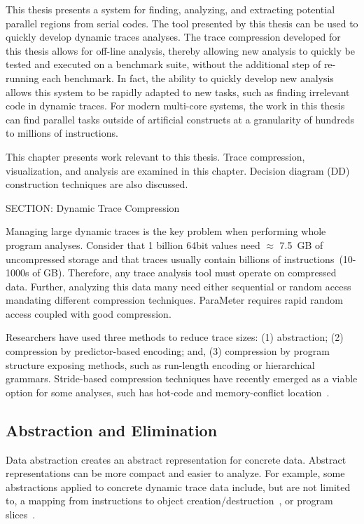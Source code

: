 {This thesis presents a system for finding, analyzing, and extracting potential parallel regions from serial codes.  The tool presented by this thesis can be used to quickly develop dynamic traces analyses. The trace compression developed for this thesis allows for off-line analysis, thereby allowing new analysis to quickly be tested and executed on a benchmark suite, without the additional step of re-running each benchmark.  In fact, the ability to quickly develop new analysis allows this system to be rapidly adapted to new tasks, such as finding irrelevant code in dynamic traces.  For modern multi-core systems, the work in this thesis can find parallel tasks outside of artificial constructs at a granularity of hundreds to millions of instructions.


This chapter presents work relevant to this thesis.  Trace compression, visualization, and analysis are examined in this chapter. Decision diagram (DD) construction techniques are also discussed.

SECTION: Dynamic Trace Compression


Managing large dynamic traces is the key problem when performing whole program analyses. Consider that 1 billion 64bit values need $\approx$ 7.5~GB of uncompressed storage and that traces usually contain billions of instructions~(10-1000s of GB). Therefore, any trace analysis tool must operate on compressed data. Further, analyzing this data many need either sequential or random access mandating different compression techniques. ParaMeter requires rapid random access coupled with good compression.

Researchers have used three methods to reduce trace sizes: (1) abstraction; (2) compression by predictor-based encoding; and, (3) compression by program structure exposing methods, such as run-length encoding or hierarchical grammars.  Stride-based compression techniques have recently emerged as a viable option for some analyses, such has hot-code and memory-conflict location~\cite{minjang:10:micro}.

\subsection{Abstraction and Elimination}

Data abstraction creates an abstract representation for concrete data. Abstract representations can be more compact and easier to analyze. For example, some abstractions applied to concrete dynamic trace data include, but are not limited to, a mapping from instructions to object creation/destruction~\cite{sridharan:07:pldi}, or program slices~\cite{zhang:04:icse}.

}
